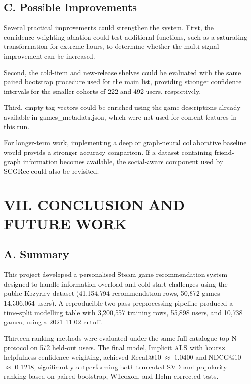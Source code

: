 \documentclass[conference]{IEEEtran}
\begin{document}
\subsection*{C. Possible Improvements}

Several practical improvements could strengthen the system. First, the confidence-weighting ablation could test additional functions, such as a saturating transformation for extreme hours, to determine whether the multi-signal improvement can be increased.

Second, the cold-item and new-release shelves could be evaluated with the same paired bootstrap procedure used for the main list, providing stronger confidence intervals for the smaller cohorts of 222 and 492 users, respectively.

Third, empty tag vectors could be enriched using the game descriptions already available in games\_metadata.json, which were not used for content features in this run.

For longer-term work, implementing a deep or graph-neural collaborative baseline would provide a stronger accuracy comparison. If a dataset containing friend-graph information becomes available, the social-aware component used by SCGRec could also be revisited.

\section*{VII. CONCLUSION AND FUTURE WORK}

\subsection*{A. Summary}

This project developed a personalised Steam game recommendation system designed to handle information overload and cold-start challenges using the public Kozyriev dataset (41,154,794 recommendation rows, 50,872 games, 14,306,064 users). A reproducible two-pass preprocessing pipeline produced a time-split modelling table with 3,200,557 training rows, 55,898 users, and 10,738 games, using a 2021-11-02 cutoff.

Thirteen ranking methods were evaluated under the same full-catalogue top-N protocol on 572 held-out users. The final model, Implicit ALS with hours\ensuremath{\times}helpfulness confidence weighting, achieved Recall@10 \ensuremath{\approx} 0.0400 and NDCG@10 \ensuremath{\approx} 0.1218, significantly outperforming both truncated SVD and popularity ranking based on paired bootstrap, Wilcoxon, and Holm-corrected tests.
\end{document}
